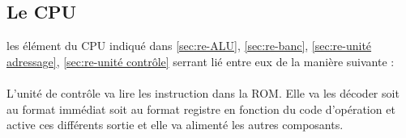 
\clearpage
\subsection{Le CPU}
\label{sec:CPU}

les élément du CPU indiqué dans \ref{sec:re-ALU}, \ref{sec:re-banc}, \ref{sec:re-unité adressage}, \ref{sec:re-unité contrôle} serrant lié entre eux de la manière suivante : 


\paragraph{} L'unité de contrôle va lire les instruction dans la ROM. Elle va les décoder soit au format immédiat soit au format registre en fonction du code d'opération et active ces différents sortie et elle va alimenté les autres composants.